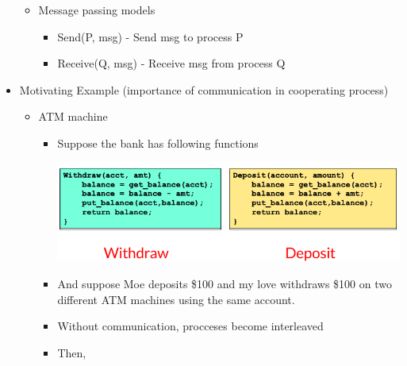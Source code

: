 \documentclass[12pt]{article}
\begin{document}
\begin{itemize}
\begin{itemize}
        \item Message passing models
        \begin{itemize}
            \item Send(P, msg) - Send msg to process P
            \item Receive(Q, msg) - Receive msg from process Q
        \end{itemize}
    \end{itemize}
    \item Motivating Example (importance of communication in cooperating process)
    \begin{itemize}
        \item ATM machine
        \begin{itemize}
            \item Suppose the bank has following functions

            \bigskip

            \begin{center}
            \includegraphics[width=0.8\linewidth]{images/week_2_notes_2_2.png}
            \end{center}

            \item And suppose Moe deposits \$100 and my love withdraws \$100 on two
            different ATM machines using the same account.


            \item Without communication, procceses become interleaved
            \item Then,


\end{itemize}
\end{itemize}
\end{itemize}
\end{document}
